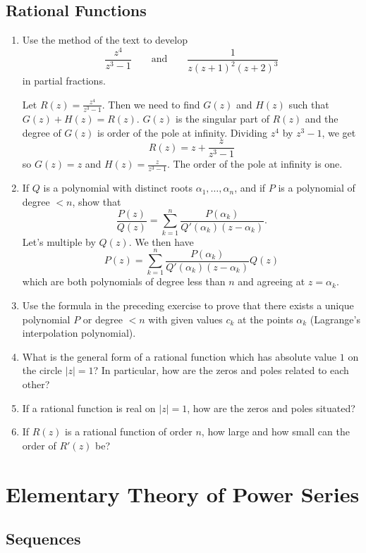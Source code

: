 \subsection{Rational Functions}

\begin{enumerate}
\item
  Use the method of the text to develop
  \[
  \frac{z^4}{z^3 - 1}\qquad\text{and}\qquad\frac{1}{z(z + 1)^2(z + 2)^3}
  \]
  in partial fractions.
  \par\smallskip
  Let \(R(z) = \frac{z^4}{z^3 - 1}\).
  Then we need to find \(G(z)\) and \(H(z)\) such that \(G(z) + H(z) = R(z)\).
  \(G(z)\) is the singular part of \(R(z)\) and the degree of \(G(z)\) is order
  of the pole at infinity.
  Dividing \(z^4\) by \(z^3 - 1\), we get
  \[
  R(z) = z + \frac{z}{z^3 - 1}
  \]
  so \(G(z) = z\) and \(H(z) = \frac{z}{z^3 - 1}\).
  The order of the pole at infinity is one.
\item
  If \(Q\) is a polynomial with distinct roots \(\alpha_1,\ldots,\alpha_n\),
  and if \(P\) is a polynomial of degree \(< n\), show that
  \[
  \frac{P(z)}{Q(z)} = \sum_{k = 1}^n
  \frac{P(\alpha_k)}{Q'(\alpha_k)(z - \alpha_k)}.
  \]
  Let's multiple by \(Q(z)\).
  We then have
  \[
  P(z) = \sum_{k = 1}^n\frac{P(\alpha_k)}{Q'(\alpha_k)(z - \alpha_k)}Q(z)
  \]
  which are both polynomials of degree less than \(n\) and agreeing at
  \(z = \alpha_k\).
\item
  Use the formula in the preceding exercise to prove that there exists a
  unique polynomial \(P\) or degree \(< n\) with given values \(c_k\) at the
  points \(\alpha_k\) (Lagrange's interpolation polynomial).
\item
  What is the general form of a rational function which has absolute value
  \(1\) on the circle \(\lvert z\rvert = 1\)?
  In particular, how are the zeros and poles related to each other?
\item
  If a rational function is real on \(\lvert z\rvert = 1\), how are the zeros
  and poles situated?
\item
  If \(R(z)\) is a rational function of order \(n\), how large and how small
  can the order of \(R'(z)\) be?
\end{enumerate}

\section{Elementary Theory of Power Series}

\subsection{Sequences}

